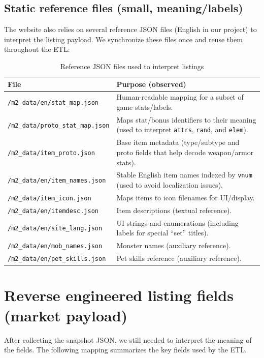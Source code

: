 \subsection{Static reference files (small, meaning/labels)}
The website also relies on several reference JSON files (English in our project) to interpret the listing payload.
We synchronize these files once and reuse them throughout the ETL:

\begin{table}[!ht]
\centering
\caption{Reference JSON files used to interpret listings}
\begin{tabularx}{\linewidth}{@{}lX@{}}
	\toprule
	\textbf{File} & \textbf{Purpose (observed)} \\
\midrule
	\texttt{/m2\_data/en/stat\_map.json} & Human-readable mapping for a subset of game stats/labels.
\\
	\texttt{/m2\_data/proto\_stat\_map.json} & Maps stat/bonus identifiers to their meaning (used to interpret \texttt{attrs}, \texttt{rand}, and \texttt{elem}).
\\
	\texttt{/m2\_data/item\_proto.json} & Base item metadata (type/subtype and proto fields that help decode weapon/armor stats).
\\
	\texttt{/m2\_data/en/item\_names.json} & Stable English item names indexed by \texttt{vnum} (used to avoid localization issues).
\\
	\texttt{/m2\_data/item\_icon.json} & Maps items to icon filenames for UI/display.
\\
	\texttt{/m2\_data/en/itemdesc.json} & Item descriptions (textual reference).
\\
	\texttt{/m2\_data/en/site\_lang.json} & UI strings and enumerations (including labels for special ``set'' titles).
\\
	\texttt{/m2\_data/en/mob\_names.json} & Monster names (auxiliary reference).
\\
	\texttt{/m2\_data/en/pet\_skills.json} & Pet skills reference (auxiliary reference).
\\
\bottomrule
\end{tabularx}
\end{table}

\section{Reverse engineered listing fields (market payload)}
After collecting the snapshot JSON, we still needed to interpret the meaning of the fields.
The following mapping summarizes the key fields used by the ETL.

